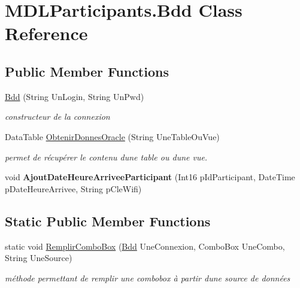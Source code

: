 \hypertarget{class_m_d_l_participants_1_1_bdd}{}\section{M\+D\+L\+Participants.\+Bdd Class Reference}
\label{class_m_d_l_participants_1_1_bdd}
\subsection*{Public Member Functions}
\begin{DoxyCompactItemize}
\item 
\hyperlink{class_m_d_l_participants_1_1_bdd_a0b1573b8583b8a36d8b9badd7d4fea75}{Bdd} (String Un\+Login, String Un\+Pwd)
\begin{DoxyCompactList}\small\item\em constructeur de la connexion \end{DoxyCompactList}\item 
Data\+Table \hyperlink{class_m_d_l_participants_1_1_bdd_abd7da8d1db22121522c19981fadb8a49}{Obtenir\+Donnes\+Oracle} (String Une\+Table\+Ou\+Vue)
\begin{DoxyCompactList}\small\item\em permet de récupérer le contenu d\textquotesingle{}une table ou d\textquotesingle{}une vue. \end{DoxyCompactList}\item 
\hypertarget{class_m_d_l_participants_1_1_bdd_a0f7bc6534737252b49e36318ba2005b2}{}void {\bfseries Ajout\+Date\+Heure\+Arrivee\+Participant} (Int16 p\+Id\+Participant, Date\+Time p\+Date\+Heure\+Arrivee, String p\+Cle\+Wifi)\label{class_m_d_l_participants_1_1_bdd_a0f7bc6534737252b49e36318ba2005b2}

\end{DoxyCompactItemize}
\subsection*{Static Public Member Functions}
\begin{DoxyCompactItemize}
\item 
static void \hyperlink{class_m_d_l_participants_1_1_bdd_a2b5d8e9ad5405fdf4522e1d2e82d13f1}{Remplir\+Combo\+Box} (\hyperlink{class_m_d_l_participants_1_1_bdd}{Bdd} Une\+Connexion, Combo\+Box Une\+Combo, String Une\+Source)
\begin{DoxyCompactList}\small\item\em méthode permettant de remplir une combobox à partir d\textquotesingle{}une source de données \end{DoxyCompactList}\end{DoxyCompactItemize}


